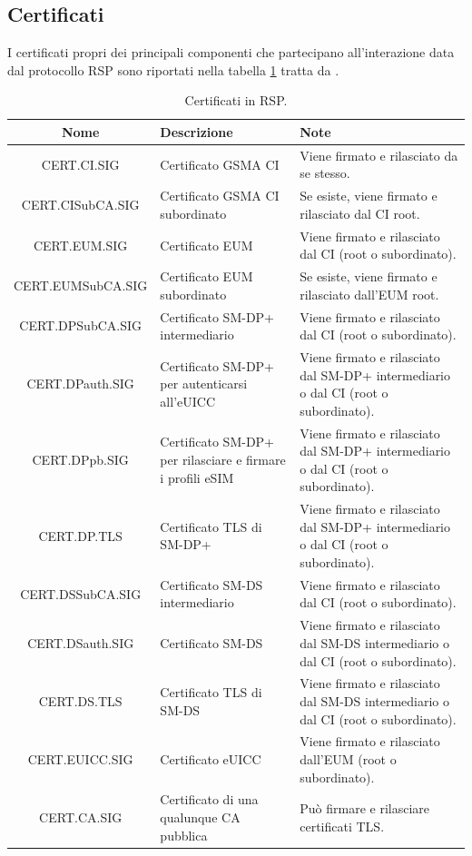 \documentclass[10pt, oneside]{book}
\begin{document}
\subsection{Certificati}\label{sec:certificates}
I certificati propri dei principali componenti che partecipano all'interazione data dal protocollo RSP sono riportati nella tabella \ref{tab:cert} tratta da \cite{GSMA-docs-new}.\\
\begin{table}[h!]
\begin{center}
\captionsetup{skip=4pt}
\caption{Certificati in RSP.}
\label{tab:cert}
\begin{tabularx}{\textwidth}{|c|X|X|}
\hline
\textbf{Nome} & \textbf{Descrizione} & \textbf{Note}\\
\hline
CERT.CI.SIG & Certificato GSMA CI & Viene firmato e rilasciato da se stesso.\\
\hline
CERT.CISubCA.SIG & Certificato GSMA CI subordinato & Se esiste, viene firmato e rilasciato dal CI root.\\
\hline
CERT.EUM.SIG & Certificato EUM & Viene firmato e rilasciato dal CI (root o subordinato).\\
\hline
CERT.EUMSubCA.SIG & Certificato EUM subordinato & Se esiste, viene firmato e rilasciato dall'EUM root.\\
\hline
CERT.DPSubCA.SIG & Certificato SM-DP+ intermediario & Viene firmato e rilasciato dal CI (root o subordinato).\\
\hline
CERT.DPauth.SIG & Certificato SM-DP+ per autenticarsi all'eUICC & Viene firmato e rilasciato dal SM-DP+ intermediario o dal CI (root o subordinato).\\
\hline
CERT.DPpb.SIG & Certificato SM-DP+ per rilasciare e firmare i profili eSIM & Viene firmato e rilasciato dal SM-DP+ intermediario o dal CI (root o subordinato).\\
\hline
CERT.DP.TLS & Certificato TLS di SM-DP+ & Viene firmato e rilasciato dal SM-DP+ intermediario o dal CI (root o subordinato).\\
\hline
CERT.DSSubCA.SIG & Certificato SM-DS intermediario & Viene firmato e rilasciato dal CI (root o subordinato).\\
\hline
CERT.DSauth.SIG & Certificato SM-DS & Viene firmato e rilasciato dal SM-DS intermediario o dal CI (root o subordinato).\\
\hline
CERT.DS.TLS & Certificato TLS di SM-DS & Viene firmato e rilasciato dal SM-DS intermediario o dal CI (root o subordinato).\\
\hline
CERT.EUICC.SIG & Certificato eUICC & Viene firmato e rilasciato dall'EUM (root o subordinato).\\
\hline
CERT.CA.SIG & Certificato di una qualunque CA pubblica & Può firmare e rilasciare certificati TLS.\\
\hline
\end{tabularx}
\end{center}
\end{table}
\end{document}
